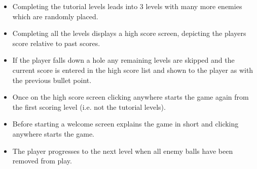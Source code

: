 \begin{itemize}
	\item Completing the tutorial levels leads into 3 levels with many more enemies which are randomly placed.
	\item Completing all the levels displays a high score screen, depicting the players score relative to past scores.
	\item If the player falls down a hole any remaining levels are skipped and the current score is entered in the high score list and shown to the player as with the previous bullet point.
	\item Once on the high score screen clicking anywhere starts the game again from the first scoring level (i.e. not the tutorial levels).
	\item Before starting a welcome screen explains the game in short and clicking anywhere starts the game.
	\item The player progresses to the next level when all enemy balls have been removed from play.
\end{itemize}
